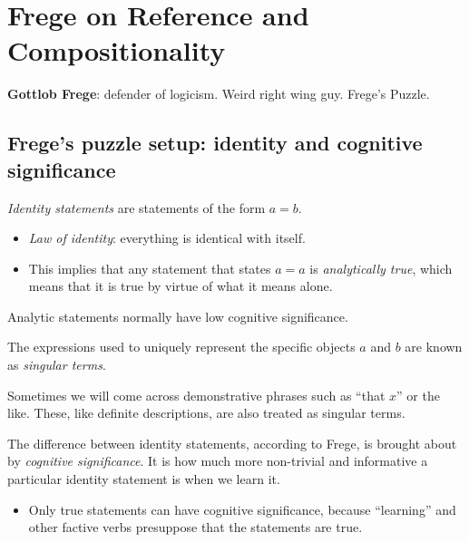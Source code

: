 \chapter{Frege on Reference and Compositionality}

\textbf{Gottlob Frege}: defender of logicism. Weird right wing guy. Frege's Puzzle.

\section{Frege's puzzle setup: identity and cognitive significance}

\begin{definition}[Identity]
\emph{Identity statements} are statements of the form $a = b$.
\begin{itemize}
  \item \emph{Law of identity}: everything is identical with itself.
  \item This implies that any statement that states $a = a$ is \emph{analytically true}, which means that it is true by virtue of what it means alone.
\end{itemize}
\end{definition}

\begin{note}
Analytic statements normally have low cognitive significance.
\end{note}

\begin{definition}
The expressions used to uniquely represent the specific objects $a$ and $b$ are known as \emph{singular terms}.
\end{definition}

Sometimes we will come across demonstrative phrases such as ``that $x$'' or the like. These, like definite descriptions, are also treated as singular terms.

\begin{definition}
The difference between identity statements, according to Frege, is brought about by \emph{cognitive significance}. It is how much more non-trivial and informative a particular identity statement is when we learn it.
\begin{itemize}
  \item Only true statements can have cognitive significance, because ``learning'' and other factive verbs presuppose that the statements are true.
\end{itemize}
\end{definition}

